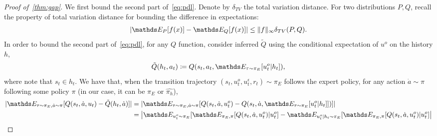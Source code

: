 \begin{proof}[Proof of~\cref{thm:gap}]
We first bound the second part of~\cref{eq:pdl}. Denote by $\delta_{TV}$ the total variation distance. For two distributions $P,Q$, recall the property of total variation distance for bounding the difference in expectations:
\begin{align*}
\abs{\expectE_P[f(x)]-\expectE_Q[f(x)]}\leq \norm{f}_\infty \delta_{TV}(P,Q).
\end{align*}
In order to bound the second part of~\cref{eq:pdl}, for any $Q$ function, consider inferred $\tilde{Q}$ using the conditional expectation of $u^o$ on the history $h$,
\begin{equation*}
\tilde{Q}(h_t,a_t)\coloneqq Q(s_t,a_t,\expectE_{\tau\sim \pi_E}[u^o_t\lvert h_t]),
\end{equation*}
where note that $s_t\in h_t$. We have that, when the transition trajectory $(s_t,u^o_t,u^\epsilon_t,r_t)\sim \pi_E$ follows the expert policy, for any action $\dot{a}\sim \pi$ following some policy $\pi$ (in our case, it can be $\pi_E$ or $\hat{\pi_h}$),
\begin{align}
\abs{\expectE_{\tau\sim\pi_E,\dot{a}\sim\pi}[Q(s_t,\dot{a},u_t)-\tilde{Q}(h_t,\dot{a})]}&=\left\lvert\expectE_{\tau\sim\pi_E,\dot{a}\sim\pi}[Q(s_t,\dot{a},u^o_t)-Q(s_t,\dot{a},\expectE_{\tau\sim\pi_E}[u^o_t\lvert h_t]])]\right\rvert\nonumber\\
&=\left\lvert\expectE_{u^o_t\sim\pi_E}[\expectE_{\pi_E,\pi}[Q(s_t,\dot{a},u^o_t)\lvert u^o_t]-\expectE_{u^o_t\lvert h_t\sim\pi_E}[\expectE_{\pi_E,\pi}[Q(s_t,\dot{a},u^o_t)\lvert u^o_t]\right\rvert\label{eq:tower_property}\\

\end{align}
\end{proof}
